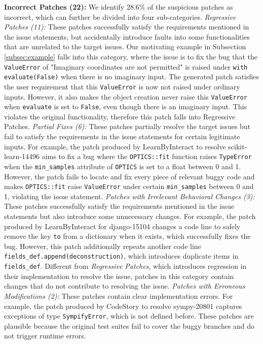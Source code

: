 %
%
\textbf{Incorrect Patches (22):} We identify 28.6\% of the suspicious patches as incorrect, which can further be divided into four sub-categories.
 \textit{Regressive Patches (11):} 
These patches successfully satisfy the requirements mentioned in the issue statements, but accidentally introduce faults into some functionalities that are unrelated to the target issues. 
Our motivating example in Subsection \ref{subsec:example} falls into this category, where the issue is to fix the bug that the \verb|ValueError| of "Imaginary coordinates are not permitted" is raised under \verb|with evaluate(False)| when there is no imaginary input. 
The generated patch satisfies the user requirement that this \verb|ValueError| is now not raised under ordinary inputs. 
However, it also makes the object creation never raise this \verb|ValueError| when \verb|evaluate| is set to \verb|False|, 
even though there is an imaginary input. 
This violates the original functionality, therefore this patch falls into Regressive Patches. 
 \textit{Partial Fixes (6):} 
These patches partially resolve the target issues but fail to satisfy the requirements in the issue statements for certain legitimate inputs.
For example, the patch produced by LearnByInteract to resolve scikit-learn-14496 aims to fix a bug where the \verb|OPTICS::fit| function raises \verb|TypeError| when the \verb|min_samples| attribute of \verb|OPTICS| is set to a float between 0 and 1. 
However, the patch fails to locate and fix every piece of relevant buggy code and makes \verb|OPTICS::fit| raise \verb|ValueError| under certain \verb|min_samples| between 0 and 1, violating the issue statement.
 \textit{Patches with Irrelevant Behavioral Changes (3):} 
These patches successfully satisfy the requirements mentioned in the issue statements but also introduce some unnecessary changes. 
For example, the patch produced by LearnByInteract for django-15104 changes a code line to safely remove the key \verb|to| from a dictionary when it exists, which successfully fixes the bug. 
However, this patch additionally repeats another code line \verb|fields_def.append(deconstruction)|, 
which introduces duplicate items in \verb|fields_def|. 
Different from \emph{Regressive Patches}, which introduces regression in their implementation to resolve the issue, 
patches in this category contain changes that do not contribute to resolving the issue. 
 \textit{Patches with Erroneous Modifications (2):} 
These patches contain clear implementation errors. 
For example, the patch produced by CodeStory to resolve sympy-20801 captures exceptions of type \verb|SympifyError|, which is not defined before. 
These patches are plausible because the original test suites fail to cover the buggy branches and do not trigger runtime errors.

